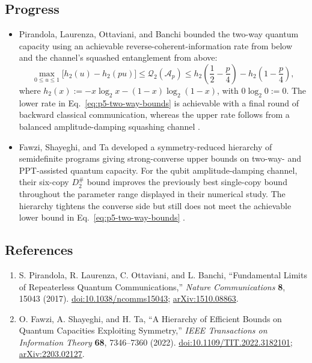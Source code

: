 \subsection*{Progress}

\begin{itemize}
  \item Pirandola, Laurenza, Ottaviani, and Banchi bounded the two-way quantum
  capacity using an achievable reverse-coherent-information rate from below
  and the channel's squashed entanglement from above:
  \begin{equation}
    \max_{0\le u\le1}\bigl[h_2(u)-h_2(pu)\bigr]
    \le \mathcal{Q}_2(\mathcal A_p)
    \le h_2\!\left(\frac12-\frac p4\right)
       -h_2\!\left(1-\frac p4\right),
    \label{eq:p5-two-way-bounds}
  \end{equation}
  where $h_2(x):=-x\log_2x-(1-x)\log_2(1-x)$, with $0\log_2 0:=0$.  The lower rate in
  Eq.~\eqref{eq:p5-two-way-bounds} is achievable with a final round of
  backward classical communication, whereas the upper rate follows from a
  balanced amplitude-damping squashing channel
  .

  \item Fawzi, Shayeghi, and Ta developed a symmetry-reduced hierarchy of
  semidefinite programs giving strong-converse upper bounds on two-way- and
  PPT-assisted quantum capacity.  For the qubit amplitude-damping channel,
  their six-copy $D^{\#}_2$ bound improves the previously best single-copy
  bound throughout the parameter range displayed in their numerical study.
  The hierarchy tightens the converse side but still does not meet the
  achievable lower bound in Eq.~\eqref{eq:p5-two-way-bounds}
  .
\end{itemize}

\subsection*{References}

\begin{enumerate}[label={},leftmargin=4.8em,labelsep=0.5em]
  \footnotesize
  \item[\textup{[PLOB17]}]\label{ref:p5-pirandola}
  S. Pirandola, R. Laurenza, C. Ottaviani, and L. Banchi,
  ``Fundamental Limits of Repeaterless Quantum Communications,''
  \emph{Nature Communications} \textbf{8}, 15043 (2017).
  \href{https://doi.org/10.1038/ncomms15043}{doi:10.1038/ncomms15043};
  \href{https://arxiv.org/pdf/1510.08863}{arXiv:1510.08863}.

  \item[\textup{[FST22]}]\label{ref:p5-fawzi-shayeghi-ta}
  O. Fawzi, A. Shayeghi, and H. Ta,
  ``A Hierarchy of Efficient Bounds on Quantum Capacities Exploiting
  Symmetry,'' \emph{IEEE Transactions on Information Theory} \textbf{68},
  7346--7360 (2022).
  \href{https://doi.org/10.1109/TIT.2022.3182101}%
       {doi:10.1109/TIT.2022.3182101};
  \href{https://arxiv.org/abs/2203.02127}{arXiv:2203.02127}.
\end{enumerate}

